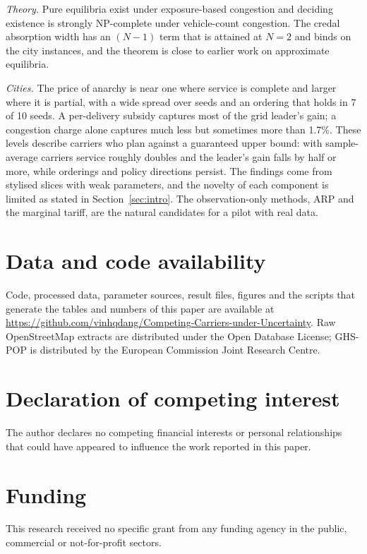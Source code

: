 \documentclass[preprint,11pt]{elsarticle}
\theoremstyle{definition}
\theoremstyle{remark}
\begin{document}
\emph{Theory.} Pure equilibria exist under exposure-based congestion and deciding existence is strongly NP-complete under vehicle-count congestion. The credal absorption width has an $(N-1)$ term that is attained at $N=2$ and binds on the city instances, and the theorem is close to earlier work on approximate equilibria.

\emph{Cities.} The price of anarchy is near one where service is complete and larger where it is partial, with a wide spread over seeds and an ordering that holds in 7 of 10 seeds. A per-delivery subsidy captures most of the grid leader's gain; a congestion charge alone captures much less but sometimes more than 1.7\%. These levels describe carriers who plan against a guaranteed upper bound: with sample-average carriers service roughly doubles and the leader's gain falls by half or more, while orderings and policy directions persist. The findings come from stylised slices with weak parameters, and the novelty of each component is limited as stated in Section~\ref{sec:intro}. The observation-only methods, ARP and the marginal tariff, are the natural candidates for a pilot with real data.

\section*{Data and code availability}
Code, processed data, parameter sources, result files, figures and the scripts that generate the tables and numbers of this paper are available at \url{https://github.com/vinhqdang/Competing-Carriers-under-Uncertainty}. Raw OpenStreetMap extracts are distributed under the Open Database License; GHS-POP is distributed by the European Commission Joint Research Centre.

\section*{Declaration of competing interest}
The author declares no competing financial interests or personal relationships that could have appeared to influence the work reported in this paper.

\section*{Funding}
This research received no specific grant from any funding agency in the public, commercial or not-for-profit sectors.
\end{document}

